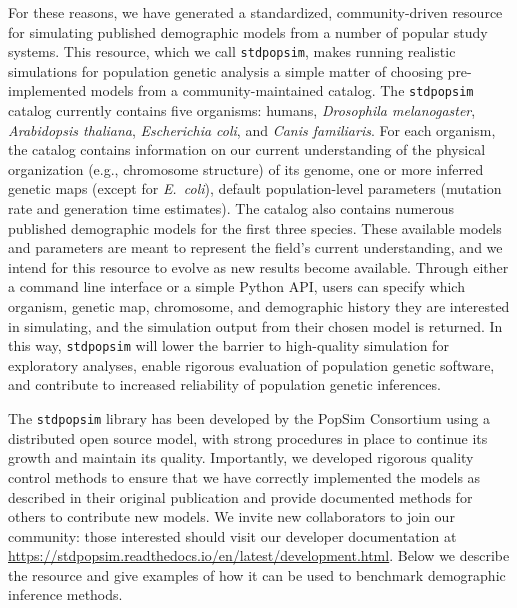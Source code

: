 \documentclass[12pt,halfline,a4paper]{ouparticle}
\newcommand{\stdpopsim}{\texttt{stdpopsim}\xspace}
\begin{document}
For these reasons, we have generated a standardized, community-driven resource
for simulating published demographic models from a number of popular study systems.
This resource, which we call \stdpopsim, makes running
realistic simulations for population genetic analysis a simple matter of
choosing pre-implemented models from a community-maintained catalog.
The \stdpopsim catalog currently contains five organisms: humans,
\textit{Drosophila melanogaster}, \textit{Arabidopsis thaliana},
\textit{Escherichia coli}, and \textit{Canis familiaris}.
For each organism, the catalog contains information on our current understanding of
the physical organization (e.g., chromosome structure) of its genome,
one or more inferred genetic maps (except for \textit{E.~coli}),
default population-level parameters (mutation rate and generation time estimates).
The catalog also contains numerous published demographic models for the first three species.
These available models and parameters are meant to represent the field's current understanding,
and we intend for this resource to evolve as new results become available.
Through either a command line interface or a simple Python API, users can specify which
organism, genetic map, chromosome, and demographic history they are interested in simulating, and the
simulation output from their chosen model is returned.
In this way, \stdpopsim will lower the barrier to high-quality simulation for exploratory analyses,
enable rigorous evaluation of population genetic software,
and contribute to increased reliability of population genetic inferences.


The \stdpopsim library has been developed by the PopSim Consortium using a
distributed open source model, with strong procedures in place
to continue its growth and maintain its quality.
Importantly, we developed rigorous quality control methods to ensure that we have
correctly implemented the models as described in their original publication
and provide documented methods for others to contribute new models.
We invite new collaborators to join our community:
those interested should visit our developer documentation at
\url{https://stdpopsim.readthedocs.io/en/latest/development.html}.
Below we describe the resource and give
examples of how it can be used to benchmark demographic inference methods.
\end{document}
